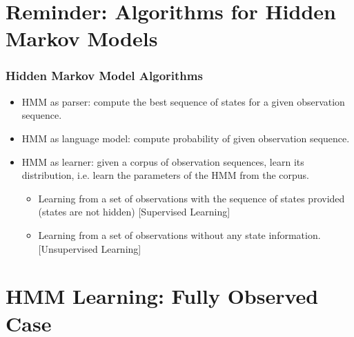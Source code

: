 
\section{Reminder: Algorithms for Hidden Markov Models}

\begin{frame}
\frametitle{Hidden Markov Model Algorithms}
\begin{itemize}
\item HMM as parser: compute the best sequence of states for a given observation sequence.
\item HMM as language model: compute probability of given observation sequence.
\item HMM as learner: given a corpus of observation sequences, learn its distribution, i.e. learn the parameters of the HMM from the corpus.
\begin{itemize}
\item Learning from a set of observations with the sequence of states provided (states are not hidden) {\color{blue} [Supervised Learning]}
\item Learning from a set of observations without any state information. {\color{blue} [Unsupervised Learning]}
\end{itemize}
\end{itemize}
\end{frame}

\section{HMM Learning: Fully Observed Case}

